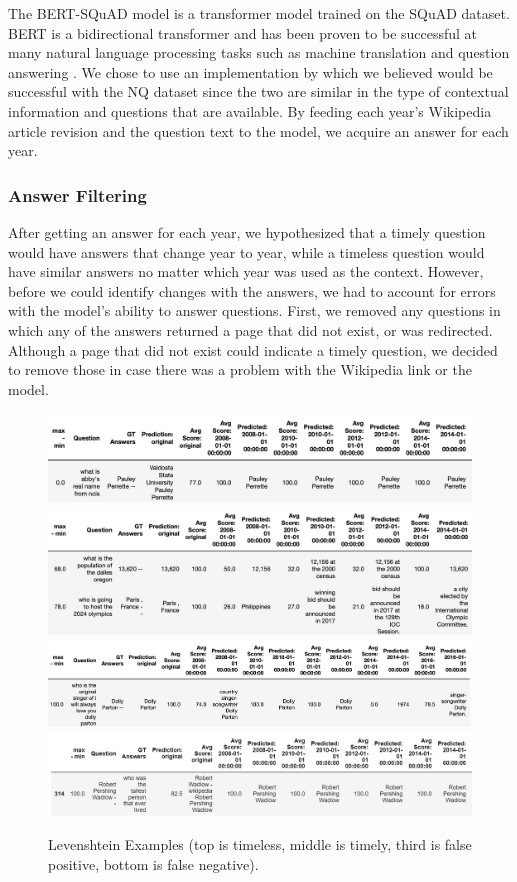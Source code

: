 \documentclass{article}
\begin{document}
The BERT-SQuAD model is a transformer model trained on the SQuAD dataset. BERT
is a bidirectional transformer and has been proven to be successful at many
natural language processing tasks such as machine translation and question
answering \cite{bert}. We chose to use an implementation by \cite{bertsquad}
which we believed would be successful with the NQ dataset since the two are
similar in the type of contextual information and questions that are available.
By feeding each year’s Wikipedia article revision and the question text to the
model, we acquire an answer for each year.

\subsubsection{Answer Filtering}
After getting an answer for each year, we hypothesized that a timely question
would have answers that change year to year, while a timeless question would
have similar answers no matter which year was used as the context. However,
before we could identify changes with the answers, we had to account for errors
with the model’s ability to answer questions. First, we removed any questions in
which any of the answers returned a page that did not exist, or was redirected.
Although a page that did not exist could indicate a timely question, we decided
to remove those in case there was a problem with the Wikipedia link or the
model. \begin{figure}[ht]
	\begin{center}
		\includegraphics[width=5in]{timeless leven.png}
		\includegraphics[width=5in]{timely leven.png}
		\includegraphics[width=5in]{leven false pos.png}
		\includegraphics[width=5in]{leven_false_neg.PNG}
	\end{center}
	\caption{Levenshtein Examples (top is timeless, middle is timely, third is false positive, bottom is false negative).}
	\label{fig:levenshtein_examples}
\end{figure}
\end{document}
